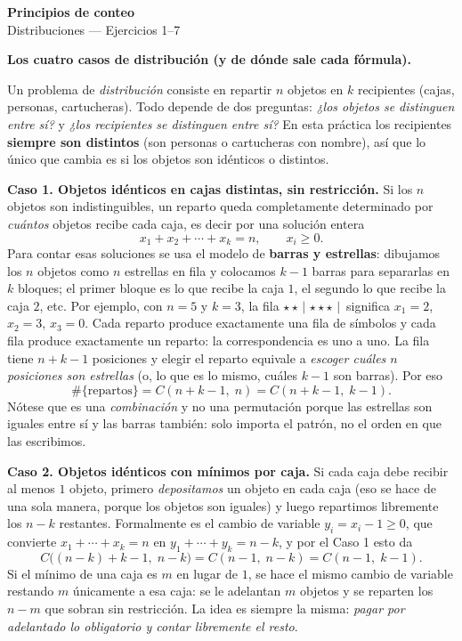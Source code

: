 \documentclass[11pt]{article}
\begin{document}
\begin{center}{\LARGE\bfseries Principios de conteo}\\[2pt]{\large Distribuciones --- Ejercicios 1--7}\end{center}

\begin{teo}
\textbf{Los cuatro casos de distribución (y de dónde sale cada fórmula).}

Un problema de \emph{distribución} consiste en repartir $n$ objetos en $k$ recipientes (cajas, personas, cartucheras). Todo depende de dos preguntas: \emph{¿los objetos se distinguen entre sí?} y \emph{¿los recipientes se distinguen entre sí?} En esta práctica los recipientes \textbf{siempre son distintos} (son personas o cartucheras con nombre), así que lo único que cambia es si los objetos son idénticos o distintos.

\medskip
\textbf{Caso 1. Objetos idénticos en cajas distintas, sin restricción.}
Si los $n$ objetos son indistinguibles, un reparto queda completamente determinado por \emph{cuántos} objetos recibe cada caja, es decir por una solución entera
\[
x_1+x_2+\cdots+x_k=n,\qquad x_i\ge 0 .
\]
Para contar esas soluciones se usa el modelo de \textbf{barras y estrellas}: dibujamos los $n$ objetos como $n$ estrellas en fila y colocamos $k-1$ barras para separarlas en $k$ bloques; el primer bloque es lo que recibe la caja $1$, el segundo lo que recibe la caja $2$, etc. Por ejemplo, con $n=5$ y $k=3$, la fila $\star\star\,|\,\star\star\star\,|\,$ significa $x_1=2$, $x_2=3$, $x_3=0$. Cada reparto produce exactamente una fila de símbolos y cada fila produce exactamente un reparto: la correspondencia es uno a uno. La fila tiene $n+k-1$ posiciones y elegir el reparto equivale a \emph{escoger cuáles $n$ posiciones son estrellas} (o, lo que es lo mismo, cuáles $k-1$ son barras). Por eso
\[
\#\{\text{repartos}\}=C(n+k-1,\;n)=C(n+k-1,\;k-1).
\]
Nótese que es una \emph{combinación} y no una permutación porque las estrellas son iguales entre sí y las barras también: solo importa el patrón, no el orden en que las escribimos.

\medskip
\textbf{Caso 2. Objetos idénticos con mínimos por caja.}
Si cada caja debe recibir al menos $1$ objeto, primero \emph{depositamos} un objeto en cada caja (eso se hace de una sola manera, porque los objetos son iguales) y luego repartimos libremente los $n-k$ restantes. Formalmente es el cambio de variable $y_i=x_i-1\ge 0$, que convierte $x_1+\cdots+x_k=n$ en $y_1+\cdots+y_k=n-k$, y por el Caso 1 esto da
\[
C\bigl((n-k)+k-1,\;n-k\bigr)=C(n-1,\;n-k)=C(n-1,\;k-1).
\]
Si el mínimo de una caja es $m$ en lugar de $1$, se hace el mismo cambio de variable restando $m$ únicamente a esa caja: se le adelantan $m$ objetos y se reparten los $n-m$ que sobran sin restricción. La idea es siempre la misma: \emph{pagar por adelantado lo obligatorio y contar libremente el resto}.


\end{teo}
\end{document}
